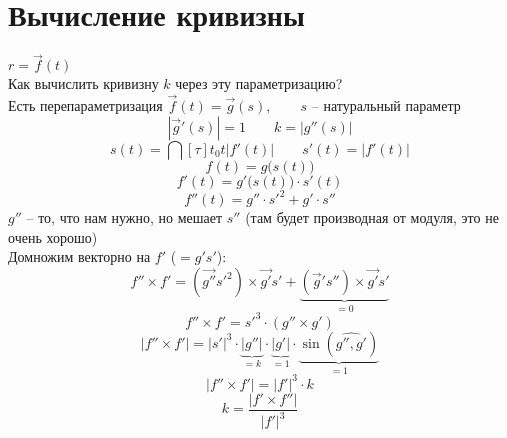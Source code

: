 \section{Вычисление кривизны}

$ r = \vec{f}(t) $ \\
Как вычислить кривизну $ k $ через эту параметризацию? \\
Есть перепараметризация $ \vec{f}(t) = \vec{g}(s), \qquad s $ -- натуральный параметр
$$ |\vec{g}'(s)| = 1 \qquad k = |g''(s)| $$
$$ s(t) = \dint[\tau]{t_0}t{|f'(t)|} \qquad s'(t) = |f'(t)| $$
$$ f(t) = g \bigg( s(t) \bigg) $$
$$ f'(t) = g' \bigg( s(t) \bigg) \cdot s'(t) $$
$$ f''(t) = g'' \cdot s'^2 + g' \cdot s'' $$
$ g'' $ -- то, что нам нужно, но мешает $ s'' $ (там будет производная от модуля, это не очень хорошо) \\
Домножим векторно на $ f' $ ($ = g's' $):
$$ f'' \times f' = (\vec{g''}s'^2) \times \vec{g'}s' + \underbrace{(\vec{g}'s'') \times \vec{g'}s'}_{= 0} $$
$$ f'' \times f' = s'^3 \cdot (g'' \times g') $$
$$ |f'' \times f'| = |s'|^3 \cdot \underbrace{|g''|}_{= k} \cdot \underbrace{|g'|}_{= 1} \cdot \underbrace{\sin(\widehat{g'', g'})}_{= 1} $$
$$ |f'' \times f'| = |f'|^3 \cdot k $$
$$ \boxed{k = \frac{|f' \times f''|}{|f'|^3}} $$

